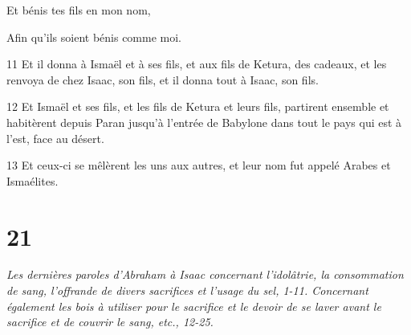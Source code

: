 \par     Et bénis tes fils en mon nom,  
\par     Afin qu'ils soient bénis comme moi.
\par    
\par 11 Et il donna à Ismaël et à ses fils, et aux fils de Ketura, des cadeaux, et les renvoya de chez Isaac, son fils, et il donna tout à Isaac, son fils.
\par 12 Et Ismaël et ses fils, et les fils de Ketura et leurs fils, partirent ensemble et habitèrent depuis Paran jusqu'à l'entrée de Babylone dans tout le pays qui est à l'est, face au désert.
\par 13 Et ceux-ci se mêlèrent les uns aux autres, et leur nom fut appelé Arabes et Ismaélites.

\chapter{21}

\par \textit{Les dernières paroles d'Abraham à Isaac concernant l'idolâtrie, la consommation de sang, l'offrande de divers sacrifices et l'usage du sel, 1-11. Concernant également les bois à utiliser pour le sacrifice et le devoir de se laver avant le sacrifice et de couvrir le sang, etc., 12-25.}

